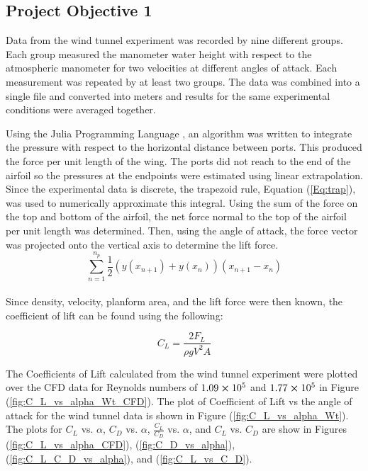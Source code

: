 \documentclass[
	12pt, %
]{fluids_report_style}
\begin{document}
\subsection{Project Objective 1}
Data from the wind tunnel experiment was recorded by nine different groups. Each group measured the manometer water height with respect to the atmospheric manometer for two velocities at different angles of attack. Each measurement was repeated by at least two groups. The data was combined into a single file and converted into meters and results for the same experimental conditions were averaged together.
\par
\bigskip

Using the Julia Programming Language \cite{bezanson2017julia}, an algorithm was written to integrate the pressure with respect to the horizontal distance between ports. This produced the force per unit length of the wing. The ports did not reach to the end of the airfoil so the pressures at the endpoints were estimated using linear extrapolation. Since the experimental data is discrete, the trapezoid rule, Equation (\ref{Eq:trap}), was used to numerically approximate this integral. Using the sum of the force on the top and bottom of the airfoil, the net force normal to the top of the airfoil per unit length was determined. Then, using the angle of attack, the force vector was projected onto the vertical axis to determine the lift force. \\


\begin{equation}
    \sum_{n=1}^{n_p} \frac{1}{2}(y(x_{n+1}) + y(x_{n}))(x_{n+1}-x_n)
    \label{Eq:trap}
\end{equation} \\



\noindent Since density, velocity, planform area, and the lift force were then known, the coefficient of lift can be found using the following: 

\begin{equation}
    C_L = \frac{2 F_L}{\rho g V^2 A}
    \label{Eq:C_L}
\end{equation}

\par
\bigskip
The Coefficients of Lift calculated from the wind tunnel experiment were plotted over the CFD data for Reynolds numbers of $1.09\cross10^5$ and $1.77\cross10^5$ in Figure (\ref{fig:C_L_vs_alpha_Wt_CFD}). The plot of Coefficient of Lift vs the angle of attack for the wind tunnel data is shown in Figure (\ref{fig:C_L_vs_alpha_Wt}). The plots for $C_L$ vs. $\alpha$, $C_D$ vs. $\alpha$, $\frac{C_L}{C_D}$ vs. $\alpha$, and $C_L$ vs. $C_D$ are show in Figures (\ref{fig:C_L_vs_alpha_CFD}), (\ref{fig:C_D_vs_alpha}), (\ref{fig:C_L_C_D_vs_alpha}), and (\ref{fig:C_L_vs_C_D}). 
\end{document}
